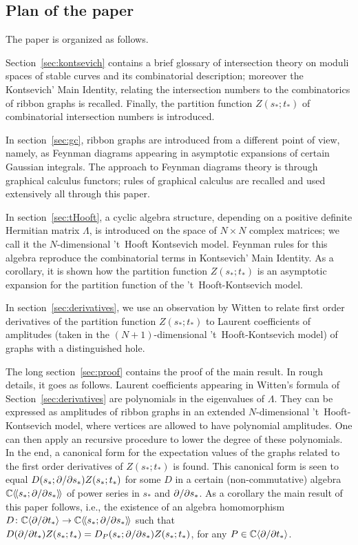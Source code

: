 \documentclass[11pt,twoside]{article}
\theoremstyle{plain}
\theoremstyle{remark}
\theoremstyle{definition}
\numberwithin{equation}{section} %
\newcommand{\expval}[1]{\langle\!\langle#1\rangle\!\rangle}
\begin{document}
\subsection*{Plan of the paper}
The paper is organized as follows.

Section~\ref{sec:kontsevich} contains a brief glossary of
intersection theory on moduli spaces of stable curves and its
combinatorial description; moreover the Kontsevich' Main Identity,
relating the intersection numbers to the combinatorics of ribbon
graphs is recalled.  Finally, the partition function $Z(s_*;t_*)$ of
combinatorial intersection numbers is introduced.

In section~\ref{sec:gc}, ribbon graphs are introduced from a different
point of view, namely, as Feynman diagrams appearing in asymptotic
expansions of certain Gaussian integrals.  The approach to Feynman
diagrams theory is through graphical calculus functors; rules of
graphical calculus are recalled and used extensively all through this
paper.

In section~\ref{sec:tHooft}, a cyclic algebra structure, depending on
a positive definite Hermitian matrix $\Lambda$, is introduced on the
space of $N\times N$ complex matrices; we call it the $N$-dimensional
't~Hooft Kontsevich model.  Feynman rules for this algebra reproduce
the combinatorial terms in Kontsevich' Main Identity.  As a
corollary, it is shown how the partition function $Z(s_*;t_*)$ is an
asymptotic expansion for the partition function of the
't~Hooft-Kontsevich model.

In section~\ref{sec:derivatives}, we use an observation by Witten to
relate first order derivatives of the partition function $Z(s_*;t_*)$
to Laurent coefficients of amplitudes (taken in the
$(N+1)$-dimensional 't~Hooft-Kontsevich model) of graphs with a
distinguished hole.

The long section~\ref{sec:proof} contains the proof of the main
result.  In rough details, it goes as follows.  Laurent coefficients
appearing in Witten's formula of Section~\ref{sec:derivatives} are
polynomials in the eigenvalues of $\Lambda$.  They can be expressed as
amplitudes of ribbon graphs in an extended $N$-dimensional
't~Hooft-Kontsevich model, where vertices are allowed to have
polynomial amplitudes.  One can then apply an recursive procedure to
lower the degree of these polynomials.  In the end, a canonical form
for the expectation values of the graphs related to the first order
derivatives of $Z(s_*;t_*)$ is found.  This canonical form is seen to
equal $D(s_*;\partial/\partial s_*)Z(s_*;t_*)$ for some $D$ in a certain
(non-commutative) algebra $\setC \langle\!\langle s_*;\del/\del s_*
\rangle\!\rangle$ of power series in $s_*$ and $\partial / \partial s_*$.  As
a corollary the main result of this paper follows, i.e., the existence
of an algebra homomorphism $D\colon\setC\langle\del/\del t_*\rangle
\to \setC\expval{ s_*;\del/\del s_*}$ such that $D(\partial/\partial
t_*)Z(s_*;t_*)=D_P(s_*;\partial/\partial s_*)Z(s_*;t_*)$, for any $P\in
\mathbb{C}\langle\partial/\partial t_*\rangle$.
\end{document}
